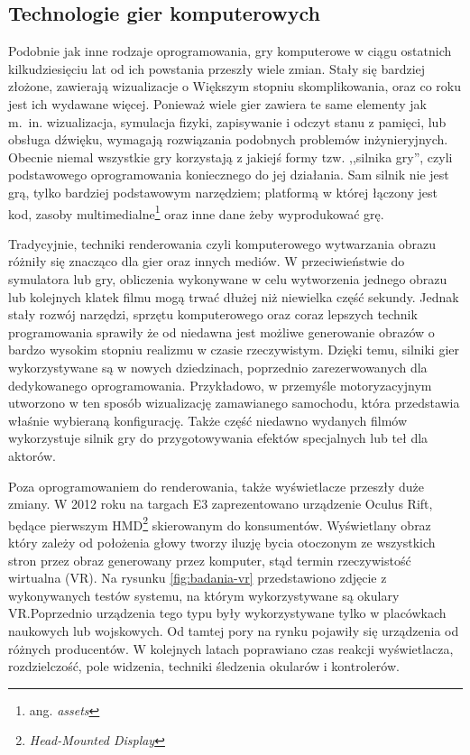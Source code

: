 \subsection{Technologie gier komputerowych}
Podobnie jak inne rodzaje oprogramowania, gry komputerowe w ciągu ostatnich kilkudziesięciu lat od ich powstania przeszły wiele zmian. Stały się bardziej złożone, zawierają wizualizacje o Większym stopniu skomplikowania, oraz co roku jest ich wydawane więcej. Ponieważ wiele gier zawiera te same elementy jak m.~in. wizualizacja, symulacja fizyki, zapisywanie i odczyt stanu z pamięci, lub obsługa dźwięku, wymagają rozwiązania podobnych problemów inżynieryjnych. Obecnie niemal wszystkie gry korzystają z jakiejś formy tzw. ,,silnika gry'', czyli podstawowego oprogramowania koniecznego do jej działania. Sam silnik nie jest grą, tylko bardziej podstawowym narzędziem; platformą w której łączony jest kod, zasoby multimedialne\footnote{ang. \emph{assets}} oraz inne dane żeby wyprodukować grę\cite{toftedahl2019}.

Tradycyjnie, techniki renderowania czyli komputerowego wytwarzania obrazu różniły się znacząco dla gier oraz innych mediów. W przeciwieństwie do symulatora lub gry, obliczenia wykonywane w celu wytworzenia jednego obrazu lub kolejnych klatek filmu mogą trwać dłużej niż niewielka część sekundy. Jednak stały rozwój narzędzi, sprzętu komputerowego oraz coraz lepszych technik programowania sprawiły że od niedawna jest możliwe generowanie obrazów o bardzo wysokim stopniu realizmu w czasie rzeczywistym. Dzięki temu, silniki gier wykorzystywane są w nowych dziedzinach, poprzednio zarezerwowanych dla dedykowanego oprogramowania. Przykładowo, w przemyśle motoryzacyjnym utworzono w ten sposób wizualizację zamawianego samochodu, która przedstawia właśnie wybieraną konfigurację\cite{audi2021}. Także część niedawno wydanych filmów wykorzystuje silnik gry do przygotowywania efektów specjalnych lub teł dla aktorów\cite{nfs2020}.

Poza oprogramowaniem do renderowania, także wyświetlacze przeszły duże zmiany. W 2012 roku na targach E3 zaprezentowano urządzenie Oculus Rift, będące pierwszym HMD\footnote{\emph{Head-Mounted Display}} skierowanym do konsumentów\cite{rubin2014}. Wyświetlany obraz który zależy od położenia głowy tworzy iluzję bycia otoczonym ze wszystkich stron przez obraz generowany przez komputer, stąd termin rzeczywistość wirtualna (VR). Na rysunku \ref{fig:badania-vr} przedstawiono zdjęcie z wykonywanych testów systemu, na którym wykorzystywane są okulary VR.Poprzednio urządzenia tego typu były wykorzystywane tylko w placówkach naukowych lub wojskowych. Od tamtej pory na rynku pojawiły się urządzenia od różnych producentów. W kolejnych latach poprawiano czas reakcji wyświetlacza, rozdzielczość, pole widzenia, techniki śledzenia okularów i kontrolerów.


